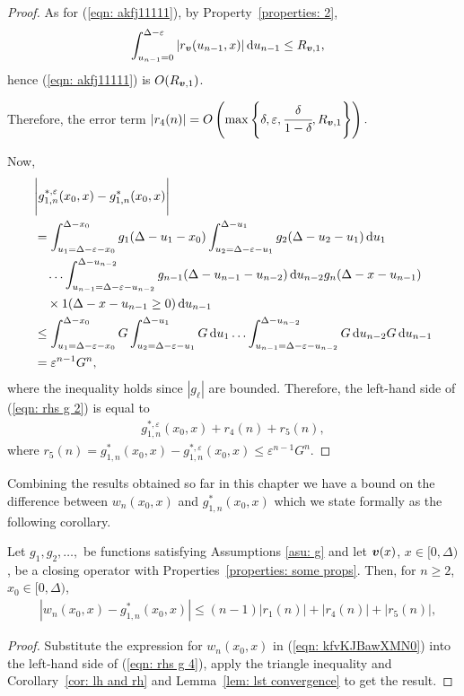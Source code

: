 \begin{proof}
	As for (\ref{eqn: akfj11111}), by Property~\ref{properties: 2}, 
	\begin{align*}
		&\int_{u_{n-1}=0}^{\Delta-\varepsilon}| r_{\boldsymbol v}(u_{n-1},x)|\, \mathrm{d} u_{n-1} 
		\leq R_{{\boldsymbol v},1},
	\end{align*}
	hence (\ref{eqn: akfj11111}) is \(O(R_{{\boldsymbol v},1})\).

	Therefore, the error term \(|r_4(n)| = O\left(\max\left\{\delta,\varepsilon,\cfrac{\delta}{1-\delta},R_{{\boldsymbol v},1}\right\}\right).\)
	
	Now, 
	\begin{align*}
		&\Bigg|g_{1,n}^{*,\varepsilon}(x_0,x) - g_{1,n}^{*}(x_0,x)
		\Bigg|\nonumber
		\\&= \int_{u_1=\Delta-\varepsilon-x_0}^{\Delta-x_0}g_1(\Delta - u_1 - x_0)
		\int_{u_2=\Delta-\varepsilon-u_1}^{\Delta-u_1}g_2(\Delta - u_2 - u_1)\, \mathrm{d} u_1  \nonumber 
		\\&\quad\hdots 
            	\int_{u_{n-1}=\Delta-\varepsilon-u_{n-2}}^{\Delta-u_{n-2}} g_{n-1}(\Delta - u_{n-1} - u_{n-2}) \, \mathrm{d} u_{n-2}
            	g_{n}(\Delta - x-u_{n-1})\nonumber 
		\\&\quad\times 1(\Delta - x-u_{n-1}\geq 0)\, \mathrm{d} u_{n-1}\nonumber
		\\&\leq \int_{u_1=\Delta-\varepsilon-x_0}^{\Delta-x_0}G 
		\int_{u_2=\Delta-\varepsilon-u_1}^{\Delta-u_1}G \, \mathrm{d} u_1  \hdots 
            	\int_{u_{n-1}=\Delta-\varepsilon-u_{n-2}}^{\Delta-u_{n-2}} G \, \mathrm{d} u_{n-2}\nonumber
            	G\, \mathrm{d} u_{n-1} 
		\\& = \varepsilon^{n-1}G ^n,
	\end{align*}
	where the inequality holds since \(|g_\ell|\) are bounded.
	Therefore, the left-hand side of (\ref{eqn: rhs g 2}) is equal to 
	\begin{align*}
		g^{*,\varepsilon}_{1,n}(x_0,x) + r_4(n) + r_5(n),
	\end{align*}
	where \(r_5(n) = g_{1,n}^{*}(x_0,x) - g_{1,n}^{*,\varepsilon}(x_0,x)\leq \varepsilon^{n-1}G ^n\).
\end{proof}

Combining the results obtained so far in this chapter we have a bound on the difference between \(w_n(x_0,x)\) and \(g_{1,n}^*(x_0,x)\) which we state formally as the following corollary.
\begin{cor}\label{cor: a cor}
	Let \(g_1,g_2,\dots,\) be functions satisfying Assumptions \ref{asu: g} and let \({\boldsymbol v}(x)\), \(x\in[0,\Delta)\), be a closing operator with Properties~\ref{properties: some props}. Then, for \(n\geq 2\), \(x_0\in[0,\Delta)\), 
	\begin{align}
		&\left|w_n(x_0,x)- g_{1,n}^{*}(x_0,x) \right|
		\leq (n-1)|r_1(n)| + |r_4(n)| + |r_5(n)|, \label{eqn: rhs g 4}
	\end{align}
\end{cor}
\begin{proof}
	Substitute the expression for \(w_n(x_0,x)\) in (\ref{eqn: kfvKJBawXMN0}) into the left-hand side of (\ref{eqn: rhs g 4}), apply the triangle inequality and Corollary~\ref{cor: lh and rh} and Lemma~\ref{lem: lst convergence} to get the result.  
\end{proof}

